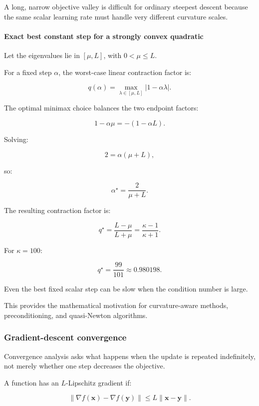 A long, narrow objective valley is difficult for ordinary steepest descent because the same scalar learning rate must handle very different curvature scales.

\paragraph{Exact best constant step for a strongly convex quadratic}\label{02-foundations-ii-ch026-exact-best-constant-step-for-a-strongly-convex-quadratic}

Let the eigenvalues lie in \([\mu,L]\), with \(0<\mu\le L\).

For a fixed step \(\alpha\), the worst-case linear contraction factor is:

\[
q(\alpha)= \max_{\lambda\in[\mu,L]} |1-\alpha\lambda|.
\]

The optimal minimax choice balances the two endpoint factors:

\[
1-\alpha\mu=-(1-\alpha L).
\]

Solving:

\[
2=\alpha(\mu+L),
\]

so:

\[
\boxed{ \alpha^\star=\frac2{\mu+L} }.
\]

The resulting contraction factor is:

\[
\boxed{ q^\star=\frac{L-\mu}{L+\mu} =\frac{\kappa-1}{\kappa+1} }.
\]

For \(\kappa=100\):

\[
q^\star=\frac{99}{101}\approx0.980198.
\]

Even the best fixed scalar step can be slow when the condition number is large.

This provides the mathematical motivation for curvature-aware methods, preconditioning, and quasi-Newton algorithms.

\subsubsection{Gradient-descent convergence}\label{02-foundations-ii-ch026-gradient-descent-convergence}

Convergence analysis asks what happens when the update is repeated indefinitely, not merely whether one step decreases the objective.

A function has an \(L\)-Lipschitz gradient if:

\[
\|\nabla f(\mathbf x)-\nabla f(\mathbf y)\| \le L\|\mathbf x-\mathbf y\|.
\]

